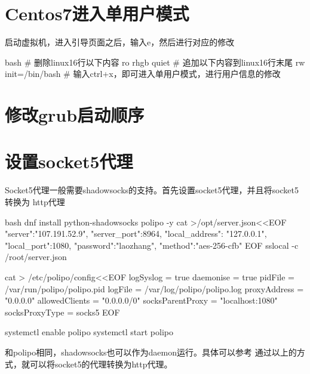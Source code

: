 \section{Centos7进入单用户模式}
启动虚拟机，进入引导页面之后，输入e，然后进行对应的修改
\begin{code-block}{bash}
# 删除linux16行以下内容
ro rhgb quiet
# 追加以下内容到linux16行末尾
rw init=/bin/bash
# 输入ctrl+x，即可进入单用户模式，进行用户信息的修改
\end{code-block}

\section{修改grub启动顺序}

\section{设置socket5代理}
Socket5代理一般需要shadowsocks的支持。首先设置socket5代理，并且将socket5转换为
http代理
\begin{code-block}{bash}
dnf install python-shadowsocks polipo -y
cat >/opt/server.json<<EOF
{
    "server":"107.191.52.9",
    "server_port":8964,
    "local_address": "127.0.0.1",
    "local_port":1080,
    "password":"laozhang",
    "method":"aes-256-cfb"
}
EOF
sslocal -c /root/server.json

cat > /etc/polipo/config<<EOF
logSyslog = true
daemonise = true
pidFile = /var/run/polipo/polipo.pid
logFile = /var/log/polipo/polipo.log
proxyAddress = "0.0.0.0"
allowedClients = "0.0.0.0/0"
socksParentProxy = "localhost:1080"
socksProxyType = socks5
EOF

systemctl enable polipo
systemctl start polipo
\end{code-block}

和polipo相同，shadowsocks也可以作为daemon运行。具体可以参考
\newline{}
通过以上的方式，就可以将socket5的代理转换为http代理。



